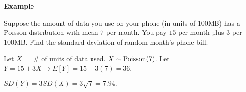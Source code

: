 \textbf{Example}

Suppose the amount of data you use on your phone (in units of $ 100 $MB) has
a Poisson distribution with mean $ 7 $ per month. You pay $ 15 $ per
month plus $ 3 $ per $ 100 $MB\@. Find the standard deviation of random
month's phone bill.

Let $ X= $ \# of units of data used. $ X \sim \operatorname{Poisson}(7) $. Let
$ Y=15+3X\rightarrow E[Y]=15+3(7)=36 $.

$ SD(Y)=3SD(X)=3\sqrt{7}=7.94. $
